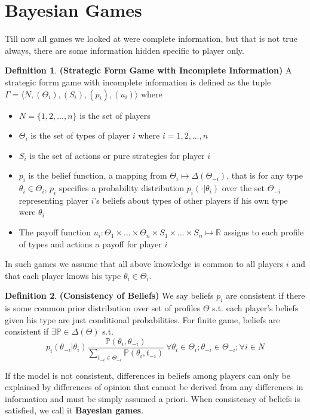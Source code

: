 \documentclass{article}
\theoremstyle{definition}
\newtheorem{defn}{Definition}[section]
\begin{document}
\section{Bayesian Games}
Till now all games we looked at were complete information, but that is not true always, there are some information hidden specific to player only.
\begin{defn}
\textbf{(Strategic Form Game with Incomplete Information)} A strategic forrm game with incomplete information is defined as the tuple $\Gamma = \langle N,(\Theta_i), (S_i), (p_i), (u_i)\rangle$ where 
\begin{itemize}
	\item $N = \{1,2,\dots,n\}$ is the set of players
	\item $\Theta_i$ is the set of types of player $i$ where $i=1,2,\dots,n$
	\item $S_i$ is the set of actions or pure strategies for player $i$
	\item $p_i$ is the belief function, a mapping from $\Theta_i \mapsto \Delta(\Theta_{-i})$, that is for any type $\theta_i \in \Theta_i$, $p_i$ specifies a probability distribution $p_i(\cdot\vert\theta_i)$ over the set $\Theta_{-i}$ representing player $i$'s beliefs about types of other players if his own type were $\theta_i$
	\item The payoff function $u_i:\Theta_1\times\dots\times\Theta_n\times S_1\times\dots\times S_n\mapsto \mathbb{R}$ assigns to each profile of types and actions a payoff for player $i$
\end{itemize}
\end{defn}
In such games we assume that all above knowledge is common to all players $i$ and that each player knows his type $\theta_i \in \Theta_i$.
\begin{defn}
\textbf{(Consistency of Beliefs)} We say beliefs $p_i$ are consistent if there is some common prior distribution over set of profiles $\Theta$ s.t. each player's beliefs given his type are just conditional probabilities. For finite game, beliefs are consistent if $\exists \mathbb{P} \in \Delta(\Theta)$ s.t. $$p_i(\theta_{-i}\vert \theta_i) \frac{\mathbb{P}(\theta_i,\theta_{-i})}{\sum_{t_{-i}\in \Theta_{-i}}\mathbb{P}(\theta_i,t_{-i})} ~\forall \theta_i\in \Theta_i;\theta_{-i}\in \Theta_{-i};\forall i\in N$$
\end{defn}
If the model is not consistent, differences in beliefs among players can only be explained by differences of opinion that cannot be derived from any differences in information and must be simply assumed a priori. When consistency of beliefs is satisfied, we call it \textbf{Bayesian games}.
\end{document}
